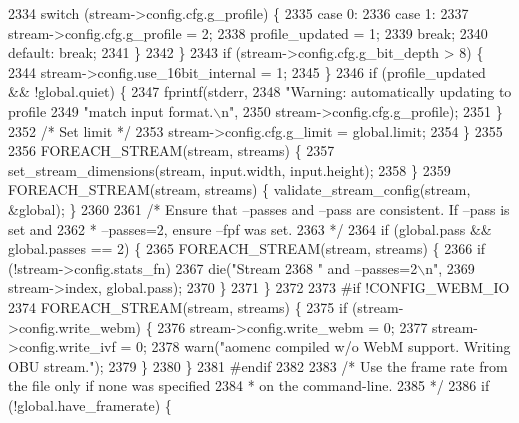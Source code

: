 \begin{DoxyCodeInclude}
{{{{{{{{{{{{{{{{{{{{{{{{{{{{{{{{{{{{{{{{{{{{{{{{{{{{{2334         \textcolor{keywordflow}{switch} (stream->config.cfg.g\_profile) \{
2335           \textcolor{keywordflow}{case} 0:
2336           \textcolor{keywordflow}{case} 1:
2337             stream->config.cfg.g\_profile = 2;
2338             profile\_updated = 1;
2339             \textcolor{keywordflow}{break};
2340           \textcolor{keywordflow}{default}: \textcolor{keywordflow}{break};
2341         \}
2342       \}
2343       \textcolor{keywordflow}{if} (stream->config.cfg.g\_bit\_depth > 8) \{
2344         stream->config.use\_16bit\_internal = 1;
2345       \}
2346       \textcolor{keywordflow}{if} (profile\_updated && !global.quiet) \{
2347         fprintf(stderr,
2348                 \textcolor{stringliteral}{"Warning: automatically updating to profile %
2349                 \textcolor{stringliteral}{"match input format.\(\backslash\)n"},
2350                 stream->config.cfg.g\_profile);
2351       \}
2352       \textcolor{comment}{/* Set limit */}
2353       stream->config.cfg.g\_limit = global.limit;
2354     \}
2355 
2356     FOREACH\_STREAM(stream, streams) \{
2357       set\_stream\_dimensions(stream, input.width, input.height);
2358     \}
2359     FOREACH\_STREAM(stream, streams) \{ validate\_stream\_config(stream, &global); \}
2360 
2361     \textcolor{comment}{/* Ensure that --passes and --pass are consistent. If --pass is set and}
2362 \textcolor{comment}{     * --passes=2, ensure --fpf was set.}
2363 \textcolor{comment}{     */}
2364     \textcolor{keywordflow}{if} (global.pass && global.passes == 2) \{
2365       FOREACH\_STREAM(stream, streams) \{
2366         \textcolor{keywordflow}{if} (!stream->config.stats\_fn)
2367           die(\textcolor{stringliteral}{"Stream %
2368               \textcolor{stringliteral}{" and --passes=2\(\backslash\)n"},
2369               stream->index, global.pass);
2370       \}
2371     \}
2372 
2373 \textcolor{preprocessor}{#if !CONFIG\_WEBM\_IO}
2374     FOREACH\_STREAM(stream, streams) \{
2375       \textcolor{keywordflow}{if} (stream->config.write\_webm) \{
2376         stream->config.write\_webm = 0;
2377         stream->config.write\_ivf = 0;
2378         warn(\textcolor{stringliteral}{"aomenc compiled w/o WebM support. Writing OBU stream."});
2379       \}
2380     \}
2381 \textcolor{preprocessor}{#endif}
2382 
2383     \textcolor{comment}{/* Use the frame rate from the file only if none was specified}
2384 \textcolor{comment}{     * on the command-line.}
2385 \textcolor{comment}{     */}
2386     \textcolor{keywordflow}{if} (!global.have\_framerate) \{
}}}}}}}}}}}}}}}}}}}}}}}}}}}}}}}}}}}}}}}}}}}}}}}}}}}}}}}
\end{DoxyCodeInclude}
